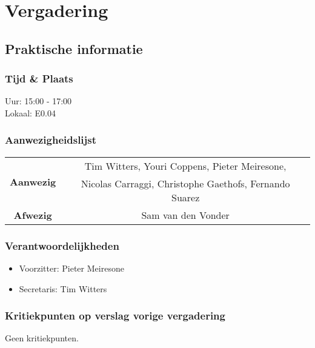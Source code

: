 \section{Vergadering \MeetingDate}
\subsection{Praktische informatie}
\subsubsection{Tijd \& Plaats}
Uur: 15:00 - 17:00
\\
Lokaal: E0.04
\subsubsection{Aanwezigheidslijst}
\begin{table}[htbp]
	\centering
	\begin{tabular}{c|c}
		\multirow{2}{*}{\textbf{Aanwezig}} & Tim Witters, Youri Coppens, Pieter Meiresone, \\
		& Nicolas Carraggi,  Christophe Gaethofs, Fernando Suarez\\
		\hline
		\textbf{Afwezig} & Sam van den Vonder \\
	\end{tabular}
\end{table}

\subsubsection{Verantwoordelijkheden}
\begin{itemize}
	\item Voorzitter: Pieter Meiresone
	\item Secretaris: Tim Witters
\end{itemize}

\subsubsection{Kritiekpunten op verslag vorige vergadering}
Geen kritiekpunten.

